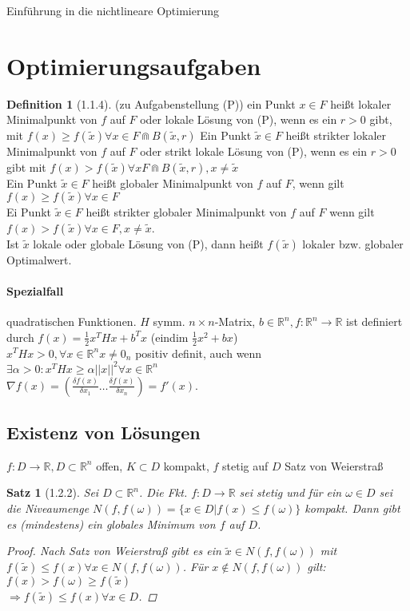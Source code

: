 \documentclass[ngerman,halfparskip]{scrartcl}
\newtheorem*{satz}{Satz}
\theoremstyle{definition}
\newtheorem*{defin}{Definition}
\def\R{\mathbb R}
\begin{document}
\huge Einführung in die nichtlineare Optimierung \normalsize

\section{Optimierungsaufgaben}
\begin{defin}[1.1.4] (zu Aufgabenstellung (P)) ein Punkt $x\in F$ heißt lokaler Minimalpunkt von $f$ auf $F$ oder lokale Lösung von (P), wenn es ein $r>0$ gibt, mit $f(x)\geq f(\tilde x)\forall x\in F \Cap B(\tilde x,r)$ Ein Punkt $\tilde x\in F$ heißt strikter lokaler Minimalpunkt von $f$ auf $F$ oder strikt lokale Lösung von (P), wenn es ein $r>0$ gibt mit $f(x)>f(\tilde x)\forall x F\Cap B(\tilde x,r), x\neq \tilde x$ \\
Ein Punkt $\tilde{x} \in F$ heißt globaler Minimalpunkt von $f$ auf $F$, wenn gilt $f(x)\geq f(\tilde{x})\forall x\in F$\\
Ei Punkt $ \tilde x \in F$ heißt strikter globaler Minimalpunkt von $f$ auf $F$ wenn gilt $ f(x) >f(\tilde x) \forall x\in F, x\neq \tilde x$.\\
Ist $\tilde x$ lokale oder globale Lösung von (P), dann heißt $f(\tilde x)$ lokaler bzw. globaler Optimalwert.
\end{defin}
\paragraph*{Spezialfall} quadratischen Funktionen. $H$ symm. $n\times n$-Matrix, $b\in\R^n, f: \R^n\rightarrow \R$ ist definiert durch $f(x)=\frac 12 x^THx+b^Tx$ (eindim $\frac 12 x^2 +bx$)\\
$x^THx>0, \forall x\in \R^n x\neq 0_n$ positiv definit, auch wenn $\exists\alpha >0: x^THx \geq \alpha ||x||^2\forall x\in\R^n$\\
$\nabla f(x)=(\frac{\delta f(x)}{\delta x_1} \ldots \frac{\delta f(x)}{\delta x_n})=f'(x)$.

\subsection*{Existenz von Lösungen}
$f:D\rightarrow \R, D\subset\R^n$ offen, $K\subset D$ kompakt, $f$ stetig auf $D$
Satz von Weierstraß
\begin{satz}[1.2.2] Sei $D\subset\R^n$. Die Fkt. $f:D\rightarrow\R$ sei stetig und für ein $\omega\in D$ sei die Niveaumenge $N(f,f(\omega))=\{x\in D| f(x)\leq f(\omega)\}$ kompakt. Dann gibt es (mindestens) ein globales Minimum von $f$ auf $D$.
\begin{proof} Nach Satz von Weierstraß gibt es ein $\tilde x\in N(f,f(\omega))$ mit $f(\tilde x)\leq f(x)\forall x\in N(f,f(\omega))$. Für $x\notin N(f,f(\omega))$ gilt: $f(x)>f(\omega)\geq f(\tilde x)$\\
$\Rightarrow f(\tilde x)\leq f(x)\forall x\in D$.
\end{proof}
\end{satz}
\end{document}
